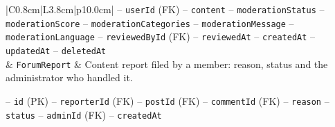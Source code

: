 \begin{center}
\begin{longtable}{|C{0.8cm}|L{3.8cm}|p{10.0cm}|}
\hspace*{1em}-- \texttt{user\allowbreak Id} (FK) \newline
\hspace*{1em}-- \texttt{content} \newline
\hspace*{1em}-- \texttt{moderation\allowbreak Status} \newline
\hspace*{1em}-- \texttt{moderation\allowbreak Score} \newline
\hspace*{1em}-- \texttt{moderation\allowbreak Categories} \newline
\hspace*{1em}-- \texttt{moderation\allowbreak Message} \newline
\hspace*{1em}-- \texttt{moderation\allowbreak Language} \newline
\hspace*{1em}-- \texttt{reviewed\allowbreak By\allowbreak Id} (FK) \newline
\hspace*{1em}-- \texttt{reviewed\allowbreak At} \newline
\hspace*{1em}-- \texttt{created\allowbreak At} \newline
\hspace*{1em}-- \texttt{updated\allowbreak At} \newline
\hspace*{1em}-- \texttt{deleted\allowbreak At} \\
 & \texttt{Forum\allowbreak Report} & Content report filed by a member: reason, status and the administrator who handled it.\par\smallskip
\hspace*{1em}-- \texttt{id} (PK) \newline
\hspace*{1em}-- \texttt{reporter\allowbreak Id} (FK) \newline
\hspace*{1em}-- \texttt{post\allowbreak Id} (FK) \newline
\hspace*{1em}-- \texttt{comment\allowbreak Id} (FK) \newline
\hspace*{1em}-- \texttt{reason} \newline
\hspace*{1em}-- \texttt{status} \newline
\hspace*{1em}-- \texttt{admin\allowbreak Id} (FK) \newline
\hspace*{1em}-- \texttt{created\allowbreak At} \\ \hline
\hline
\end{longtable}\addtocounter{table}{-1}
\end{center}

